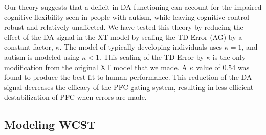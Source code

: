 Our theory suggests that a deficit in DA functioning can account for the impaired cognitive flexibility seen in people with autism, while leaving cognitive control robust and relatively unaffected. We have tested this theory by reducing the effect of the DA signal in the XT model by scaling the TD Error (AG) by a constant factor, $\kappa$. The model of typically developing individuals uses $\kappa = 1$, and autism is modeled using $\kappa < 1$. This scaling of the TD Error by $\kappa$ is the only modification from the original XT model that we made. A $\kappa$ value of $0.54$ was found to produce the best fit to human performance. This reduction of the DA signal decreases the efficacy of the PFC gating system, resulting in less efficient destabilization of PFC when errors are made.


\subsection{Modeling WCST} 


